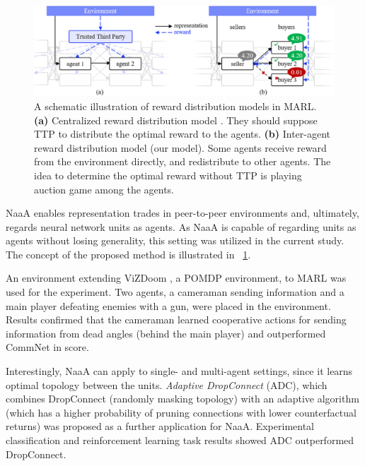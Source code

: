 \begin{figure}[tb]
	\centering
	\includegraphics[width=\linewidth]{img/TTP.eps}
	\caption{
		A schematic illustration of reward distribution models in MARL.
		{\bf (a)} Centralized reward distribution model \citep{agogino2006quicr,sukhbaatar2016learning,foerster2016learning,foerster2017counterfactual}. They should suppose TTP to distribute the optimal reward to the agents. %
		{\bf (b)} Inter-agent reward distribution model (our model). Some agents receive reward from the environment directly, and redistribute to other agents. The idea to determine the optimal reward without TTP is playing auction game among the agents.
	}
	\label{fig:ttp}
\end{figure}

NaaA enables representation trades in peer-to-peer environments and, ultimately, regards neural network units as agents.
As NaaA is capable of regarding units as agents without losing generality, this setting was utilized in the current study.
The concept of the proposed method is illustrated in \figurename~\ref{fig:ttp}.

An environment extending ViZDoom \citep{kempka2016vizdoom}, a POMDP environment, to MARL was used for the experiment.
Two agents, a cameraman sending information and a main player defeating enemies with a gun, were placed in the environment.
Results confirmed that the cameraman learned cooperative actions for sending information from dead angles (behind the main player) and outperformed CommNet in score.

Interestingly, NaaA can apply to single- and multi-agent settings, since it learns optimal topology between the units. %
{\em Adaptive DropConnect} (ADC), which combines DropConnect \citep{wan2013regularization} (randomly masking topology) with an adaptive algorithm (which has a higher probability of pruning connections with lower counterfactual returns) was proposed as a further application for NaaA.
Experimental classification and reinforcement learning task results showed ADC outperformed DropConnect.

